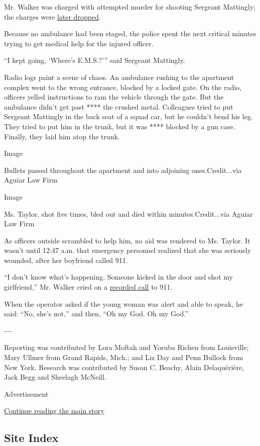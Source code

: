 Mr. Walker was charged with attempted murder for shooting Sergeant
Mattingly; the charges were
\href{https://www.nytimes3xbfgragh.onion/2020/05/22/us/Breonna-Taylor-Kenneth-Walker.html}{later
dropped}.

Because no ambulance had been staged, the police spent the next critical
minutes trying to get medical help for the injured officer.

``I kept going, `Where's E.M.S.?''' said Sergeant Mattingly.

Radio logs paint a scene of chaos. An ambulance rushing to the apartment
complex went to the wrong entrance, blocked by a locked gate. On the
radio, officers yelled instructions to ram the vehicle through the gate.
But the ambulance didn't get past **** the crushed metal. Colleagues
tried to put Sergeant Mattingly in the back seat of a squad car, but he
couldn't bend his leg. They tried to put him in the trunk, but it was
**** blocked by a gun case. Finally, they laid him atop the trunk.

Image

Bullets passed throughout the apartment and into adjoining
ones.Credit...via Aguiar Law Firm

Image

Ms. Taylor, shot five times, bled out and died within
minutes.Credit...via Aguiar Law Firm

As officers outside scrambled to help him, no aid was rendered to Ms.
Taylor. It wasn't until 12:47 a.m. that emergency personnel realized
that she was seriously wounded, after her boyfriend called 911.

``I don't know what's happening. Someone kicked in the door and shot my
girlfriend,'' Mr. Walker cried on a
\href{https://www.youtube.com/watch?v=G0EnRabtRhg}{recorded call} to
911.

When the operator asked if the young woman was alert and able to speak,
he said: ``No, she's not,'' and then, ``Oh my God. Oh my God.''

\textbf{---}

Reporting was contributed by Lora Moftah and Yoruba Richen from
Louisville; Mary Ullmer from Grand Rapids, Mich.; and Liz Day and Penn
Bullock from New York. Research was contributed by Susan C. Beachy,
Alain Delaquérière, Jack Begg and Sheelagh McNeill.

Advertisement

\protect\hyperlink{after-bottom}{Continue reading the main story}

\hypertarget{site-index}{%
\subsection{Site Index}\label{site-index}}

